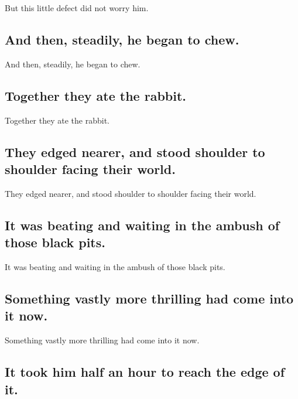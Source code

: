 \documentclass[]{article}
\begin{document}
But this little defect did not worry him.

\hypertarget{and-then-steadily-he-began-to-chew.}{%
\subsection{And then, steadily, he began to
chew.}\label{and-then-steadily-he-began-to-chew.}}

And then, steadily, he began to chew.

\hypertarget{together-they-ate-the-rabbit.}{%
\subsection{Together they ate the
rabbit.}\label{together-they-ate-the-rabbit.}}

Together they ate the rabbit.

\hypertarget{they-edged-nearer-and-stood-shoulder-to-shoulder-facing-their-world.}{%
\subsection{They edged nearer, and stood shoulder to shoulder facing
their
world.}\label{they-edged-nearer-and-stood-shoulder-to-shoulder-facing-their-world.}}

They edged nearer, and stood shoulder to shoulder facing their world.

\hypertarget{it-was-beating-and-waiting-in-the-ambush-of-those-black-pits.}{%
\subsection{It was beating and waiting in the ambush of those black
pits.}\label{it-was-beating-and-waiting-in-the-ambush-of-those-black-pits.}}

It was beating and waiting in the ambush of those black pits.

\hypertarget{something-vastly-more-thrilling-had-come-into-it-now.}{%
\subsection{Something vastly more thrilling had come into it
now.}\label{something-vastly-more-thrilling-had-come-into-it-now.}}

Something vastly more thrilling had come into it now.

\hypertarget{it-took-him-half-an-hour-to-reach-the-edge-of-it.}{%
\subsection{It took him half an hour to reach the edge of
it.}\label{it-took-him-half-an-hour-to-reach-the-edge-of-it.}}
\end{document}
